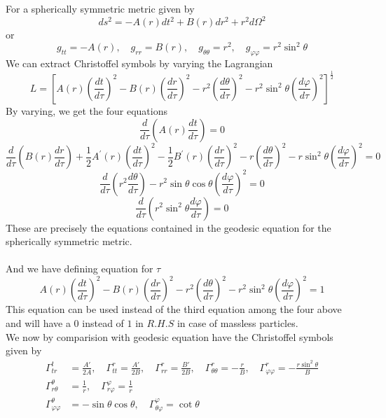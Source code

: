 ﻿\documentclass[12pt,a4paper]{article}
\begin{document}
For a spherically symmetric metric given by
$$d s ^ { 2 } = - A ( r ) d t ^ { 2 } + B ( r ) d r ^ { 2 } + r ^ { 2 } d \Omega ^ { 2 }$$
or
$$g _ { t t } = - A ( r ) , \quad g _ { r r } = B ( r ) , \quad g _ { \theta \theta } = r ^ { 2 } , \quad g _ { \varphi \varphi } = r ^ { 2 } \sin ^ { 2 } \theta$$
We can extract Christoffel symbols by varying the Lagrangian
$$L = \left[ A ( r ) \left( \frac { d t } { d \tau } \right) ^ { 2 } - B ( r ) \left( \frac { d r } { d \tau } \right) ^ { 2 } - r ^ { 2 } \left( \frac { d \theta } { d \tau } \right) ^ { 2 } - r ^ { 2 } \sin ^ { 2 } \theta \left( \frac { d \varphi } { d \tau } \right) ^ { 2 } \right] ^ { \frac { 1 } { 2 } }$$
By varying, we get the four equations
$$\frac { d } { d \tau } \left( A ( r ) \frac { d t } { d \tau } \right) = 0 $$
$$\frac { d } { d \tau } \left( B ( r ) \frac { d r } { d \tau } \right) + \frac { 1 } { 2 } A ^ { \prime } ( r ) \left( \frac { d t } { d \tau } \right) ^ { 2 } - \frac { 1 } { 2 } B ^ { \prime } ( r ) \left( \frac { d r } { d \tau } \right) ^ { 2 } - r \left( \frac { d \theta } { d \tau } \right) ^ { 2 } - r \sin ^ { 2 } \theta \left( \frac { d \varphi } { d \tau } \right) ^ { 2 } = 0$$
$$\frac { d } { d \tau } \left( r ^ { 2 } \frac { d \theta } { d \tau } \right) - r ^ { 2 } \sin \theta \cos \theta \left( \frac { d \varphi } { d \tau } \right) ^ { 2 } = 0$$
$$\frac { d } { d \tau } \left( r ^ { 2 } \sin ^ { 2 } \theta \frac { d \varphi } { d \tau } \right) = 0$$
These are precisely the equations contained in the geodesic equation for the spherically symmetric metric.\\ \\
And we have defining equation for $\tau $
$$A ( r ) \left( \frac { d t } { d \tau } \right) ^ { 2 } - B ( r ) \left( \frac { d r } { d \tau } \right) ^ { 2 } - r ^ { 2 } \left( \frac { d \theta } { d \tau } \right) ^ { 2 } - r ^ { 2 } \sin ^ { 2 } \theta \left( \frac { d \varphi } { d \tau } \right) ^ { 2 } = 1$$
This equation can be used instead of the third equation among the four above and will have a $0$ instead of $1$ in $R.H.S$ in case of massless particles.\\
We now by comparision with geodesic equation have the Christoffel symbols given by
$$\begin{aligned} \Gamma _ { t r } ^ { t } & = \frac { A' } { 2 A } , \quad \Gamma _ { t t } ^ { r } = \frac { A' } { 2 B } , \quad \Gamma _ { r r } ^ { r } =  \frac { B' } { 2 B } , \quad \Gamma _ { \theta \theta } ^ { r } = - \frac { r } { B } , \quad \Gamma _ { \varphi \varphi } ^ { r } = - \frac { r \sin ^ { 2 } \theta } { B } \\ \Gamma _ { r \theta } ^ { \theta } & = \frac { 1 } { r } , \quad \Gamma _ { r \varphi } ^ { \varphi } = \frac { 1 } { r }\\  \Gamma _ { \varphi \varphi } ^ { \theta } & = - \sin \theta \cos \theta , \quad \Gamma _ { \theta \varphi } ^ { \varphi } = \cot \theta \end{aligned}$$
\end{document}
